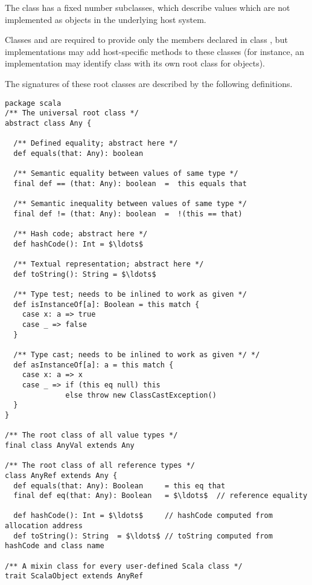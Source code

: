{{{The class  has a fixed number subclasses, which describe
values which are not implemented as objects in the underlying host
system.

Classes  and  are required to provide only
the members declared in class , but implementations may add
host-specific methods to these classes (for instance, an
implementation may identify class  with its own root
class for objects).

The signatures of these root classes are described by the following
definitions.

\begin{lstlisting}
package scala 
/** The universal root class */
abstract class Any {

  /** Defined equality; abstract here */
  def equals(that: Any): boolean 

  /** Semantic equality between values of same type */
  final def == (that: Any): boolean  =  this equals that

  /** Semantic inequality between values of same type */
  final def != (that: Any): boolean  =  !(this == that)

  /** Hash code; abstract here */
  def hashCode(): Int = $\ldots$

  /** Textual representation; abstract here */
  def toString(): String = $\ldots$

  /** Type test; needs to be inlined to work as given */
  def isInstanceOf[a]: Boolean = this match {
    case x: a => true
    case _ => false
  }

  /** Type cast; needs to be inlined to work as given */ */
  def asInstanceOf[a]: a = this match {
    case x: a => x
    case _ => if (this eq null) this
              else throw new ClassCastException()
  }
}

/** The root class of all value types */
final class AnyVal extends Any 

/** The root class of all reference types */
class AnyRef extends Any {
  def equals(that: Any): Boolean     = this eq that 
  final def eq(that: Any): Boolean   = $\ldots$  // reference equality
  
  def hashCode(): Int = $\ldots$     // hashCode computed from allocation address
  def toString(): String  = $\ldots$ // toString computed from hashCode and class name

/** A mixin class for every user-defined Scala class */
trait ScalaObject extends AnyRef 
\end{lstlisting}

}}}
